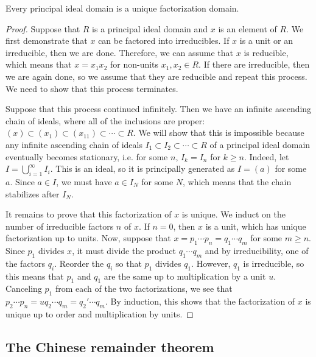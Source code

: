 \begin{theorem} 
Every principal ideal domain is a unique factorization domain.
\end{theorem} 

\begin{proof} 
Suppose that $R$ is a principal ideal domain and $x$ is an element of $R$. We
first demonstrate that $x$ can be factored into irreducibles.
If $x$ is a unit or an irreducible, then we are done. Therefore, we can assume
that $x$ is reducible, which means that $x = x_1 x_2$ for non-units 
$x_1, x_2 \in R$. If there are irreducible, then we are again done, so we
assume that they are reducible and repeat this process. We need to show that
this process terminates.

Suppose that this process continued infinitely. Then we have an infinite
ascending chain of ideals, where all of the inclusions are proper:
$(x) \subset (x_1) \subset (x_{11}) \subset \cdots \subset R$.
We will show that this is impossible because any infinite ascending chain of
ideals $I_1 \subset I_2 \subset \cdots \subset R$ of a principal ideal domain 
eventually becomes stationary, i.e. for some $n$, $I_k = I_n$ for $k \geq n$.
Indeed, let $I = \bigcup_{i=1}^\infty I_i$. This is an ideal, so it is 
principally generated as $I = (a)$ for some $a$. Since $a \in I$, we must have 
$a \in I_N$ for some $N$, which means that the chain stabilizes after $I_N$.

It remains to prove that this factorization of $x$ is unique. We induct on
the number of irreducible factors $n$ of $x$. If $n = 0$, then $x$ is a unit,
which has unique factorization up to units. Now, suppose that 
$x = p_1 \cdots p_n = q_1 \cdots q_m$ for some $m \ge n$. Since $p_1$ divides
$x$, it must divide the product $q_1 \cdots q_m$ and by irreducibility, one of
the factors $q_i$. Reorder the $q_i$ so that $p_1$ divides $q_1$. However,
$q_1$ is irreducible, so this means that $p_1$ and $q_1$ are the same up to
multiplication by a unit $u$. Canceling $p_1$ from each of the two
factorizations, we see that $p_2 \cdots p_n = u q_2 \cdots q_m = q_2' \cdots
q_m$. By induction, this shows that the factorization of $x$ is unique up to
order and multiplication by units.
\end{proof} 

\subsection{The Chinese remainder theorem}

